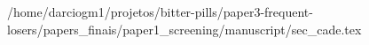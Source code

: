 /home/darciogm1/projetos/bitter-pills/paper3-frequent-losers/papers_finais/paper1_screening/manuscript/sec_cade.tex